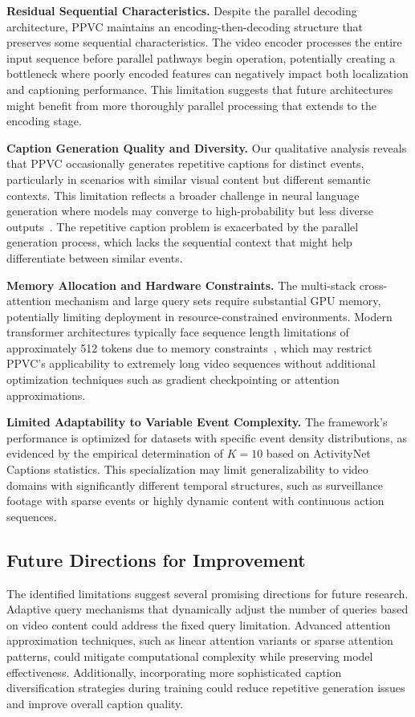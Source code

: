 \textbf{Residual Sequential Characteristics.}
Despite the parallel decoding architecture, PPVC maintains an encoding-then-decoding structure that preserves some sequential characteristics. The video encoder processes the entire input sequence before parallel pathways begin operation, potentially creating a bottleneck where poorly encoded features can negatively impact both localization and captioning performance. This limitation suggests that future architectures might benefit from more thoroughly parallel processing that extends to the encoding stage.

\textbf{Caption Generation Quality and Diversity.}
Our qualitative analysis reveals that PPVC occasionally generates repetitive captions for distinct events, particularly in scenarios with similar visual content but different semantic contexts.
This limitation reflects a broader challenge in neural language generation where models may converge to high-probability but less diverse outputs~\cite{wang2019describing}.
The repetitive caption problem is exacerbated by the parallel generation process, which lacks the sequential context that might help differentiate between similar events.

\textbf{Memory Allocation and Hardware Constraints.}
The multi-stack cross-attention mechanism and large query sets require substantial GPU memory, potentially limiting deployment in resource-constrained environments.
Modern transformer architectures typically face sequence length limitations of approximately 512 tokens due to memory constraints~\cite{tay2022efficient}, which may restrict PPVC's applicability to extremely long video sequences without additional optimization techniques such as gradient checkpointing or attention approximations.

\textbf{Limited Adaptability to Variable Event Complexity.}
The framework's performance is optimized for datasets with specific event density distributions, as evidenced by the empirical determination of $K=10$ based on ActivityNet Captions statistics.
This specialization may limit generalizability to video domains with significantly different temporal structures, such as surveillance footage with sparse events or highly dynamic content with continuous action sequences.

\subsection{Future Directions for Improvement}
The identified limitations suggest several promising directions for future research. Adaptive query mechanisms that dynamically adjust the number of queries based on video content could address the fixed query limitation. Advanced attention approximation techniques, such as linear attention variants or sparse attention patterns, could mitigate computational complexity while preserving model effectiveness. Additionally, incorporating more sophisticated caption diversification strategies during training could reduce repetitive generation issues and improve overall caption quality.